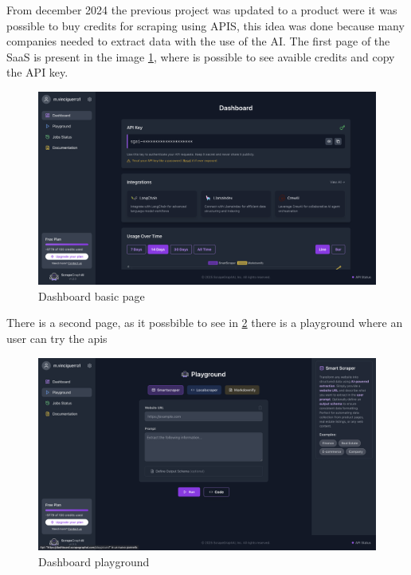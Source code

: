From december 2024 the previous project was updated to a product were it was possible to buy credits for scraping using APIS, this idea was done because many companies needed to extract data with the use of the AI.
The  first page of the SaaS is present in the image \ref{fig:enter-dashboard-basi}, where is possible to see avaible credits and copy the API key.
\begin{figure}[h!]
    \centering
    \includegraphics[width=0.95\linewidth]{Assets/dashboard_1.png}
    \caption{Dashboard basic page}
    \label{fig:enter-dashboard-basi}
\end{figure}

There is a second page, as it possbible to see in \ref{fig:enter-dashboard-playground} there is a playground where an user can try the apis
\begin{figure}[h!]
    \centering
    \includegraphics[width=0.95\linewidth]{Assets/dashboard_2.png}
    \caption{Dashboard playground}
    \label{fig:enter-dashboard-playground}
\end{figure}

